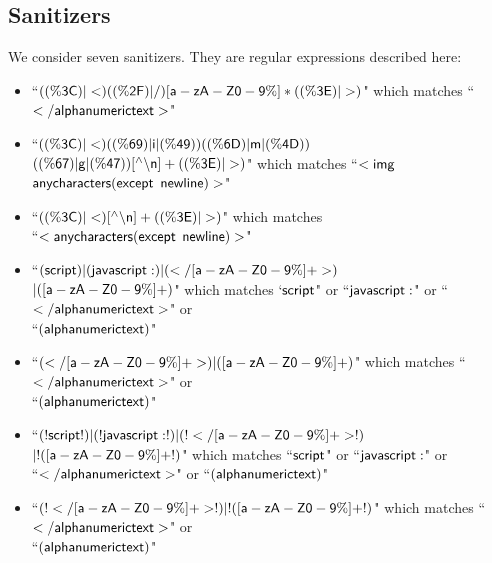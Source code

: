 \subsection{Sanitizers}
We consider seven sanitizers. They are regular expressions described here:
\begin{itemize}
	\item ``$\sf{((\%3C)|<)((\%2F)|/)[a-zA-Z0-9\%]*((\%3E)|>)}$" which matches ``$\sf{</alphanumerictext>}$"
	\item ``$\sf{((\%3C)|<)((\%69)|i|(\%49))((\%6D)|m|(\%4D))}$\\$\sf{((\%67)|g|(\%47))[^\wedge\backslash n]+((\%3E)|>)}$" which matches ``$\sf{<img}$ $\sf{anycharacters(except}$ $\sf{newline)>}$"
	\item ``$\sf{((\%3C)|<)[^\wedge\backslash n]+((\%3E)|>)}$" which matches \\``$\sf{<anycharacters(except}$ $\sf{newline)>}$"
	\item ``$\sf{(script)|(javascript:)|(</[a-zA-Z0-9\%]+>)}$\\$\sf{|([a-zA-Z0-9\%]+)}$" which matches `$\sf{script}$" or ``$\sf{javascript:}$" or ``$\sf{</alphanumerictext>}$" or \\``$\sf{(alphanumerictext)}$"
	\item ``$\sf{(</[a-zA-Z0-9\%]+>)|([a-zA-Z0-9\%]+)}$" which matches ``$\sf{</alphanumerictext>}$" or\\ ``$\sf{(alphanumerictext)}$"
	\item ``$\sf{(!script!)|(!javascript:!)|(!</[a-zA-Z0-9\%]+>!)}$\\$\sf{|!([a-zA-Z0-9\%]+!)}$" which matches ``$\sf{script}$" or ``$\sf{javascript:}$" or \\``$\sf{</alphanumerictext>}$" or ``$\sf{(alphanumerictext)}$"
	\item ``$\sf{(!</[a-zA-Z0-9\%]+>!)|!([a-zA-Z0-9\%]+!)}$" which matches ``$\sf{</alphanumerictext>}$" or\\ ``$\sf{(alphanumerictext)}$"
\end{itemize}

